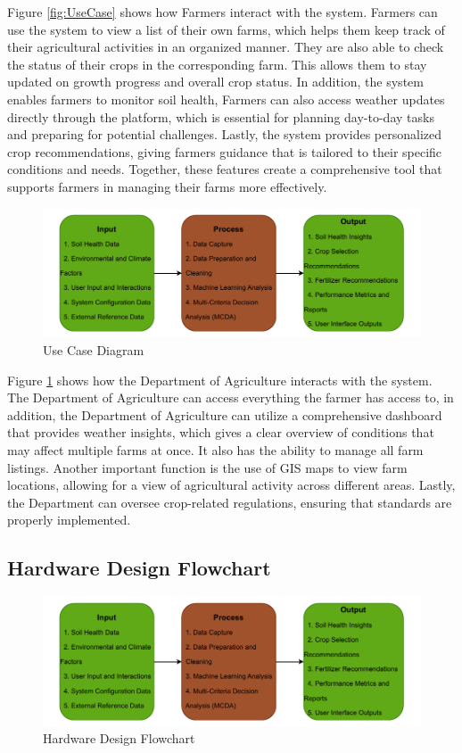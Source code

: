 {	Figure \ref{fig:UseCase} shows how Farmers interact with the system. Farmers can use the system to view a list of their own farms, which helps them keep track of their agricultural activities in an organized manner. They are also able to check the status of their crops in the corresponding farm. This allows them to stay updated on growth progress and overall crop status. In addition, the system enables farmers to monitor soil health, Farmers can also access weather updates directly through the platform, which is essential for planning day-to-day tasks and preparing for potential challenges. Lastly, the system provides personalized crop recommendations, giving farmers guidance that is tailored to their specific conditions and needs. Together, these features create a comprehensive tool that supports farmers in managing their farms more effectively.
	
	\begin{figure}[H]
		\centering
		\caption{Use Case Diagram}
		\label{fig:DAUseCase}
		\includegraphics[width=1\textwidth]{figures/IPO.pdf}
	\end{figure}
	
	Figure \ref{fig:DAUseCase} shows how the Department of Agriculture interacts with the system. The Department of Agriculture can access everything the farmer has access to, in addition, the Department of Agriculture can utilize a comprehensive dashboard that provides weather insights, which gives a clear overview of conditions that may affect multiple farms at once.  It also has the ability to manage all farm listings. Another important function is the use of GIS maps to view farm locations, allowing for a view of agricultural activity across different areas. Lastly, the Department can oversee crop-related regulations, ensuring that standards are properly implemented.
	
	\subsection{Hardware Design Flowchart}
	\begin{figure}[H]
		\centering
		\caption{Hardware Design Flowchart}
		\label{fig:HardwareFlowchart}
		\includegraphics[width=1\textwidth]{figures/IPO.pdf}
	\end{figure}
	
}
